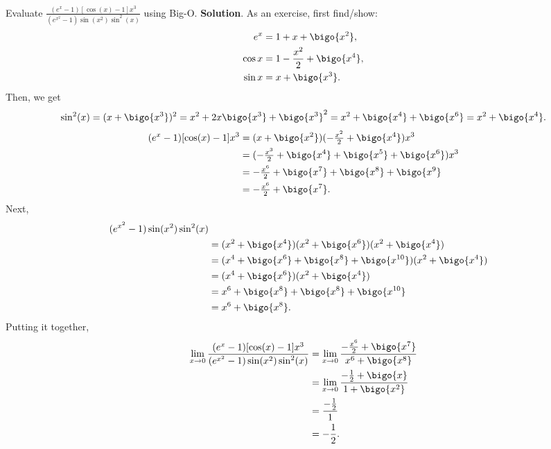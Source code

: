 \begin{Example}{}{}
    Evaluate $ \displaystyle \frac{(e^x-1)[\cos(x)-1]x^3}{(e^{x^2}-1)\sin(x^2)\sin^2(x)} $
    using Big-O\@.
    \tcblower{}
    \textbf{Solution}. As an exercise, first find/show:
    \begin{align*}
        e^x    & =1+x+\bigo{x^2},             \\
        \cos x & =1-\frac{x^2}{2}+\bigo{x^4}, \\
        \sin x & =x+\bigo{x^3}.
    \end{align*}
    Then, we get
    \[ \sin^2(x)=(x+\bigo{x^3})^2=x^2+2x\bigo{x^3}+\bigo{x^3}^2
        =x^2+\bigo{x^4}+\bigo{x^6}=x^2+\bigo{x^4}. \]
    \begin{align*}
        (e^x-1)[\cos(x)-1]x^3
         & =(x+\bigo{x^2})(-\tfrac{x^2}{2}+\bigo{x^4})x^3         \\
         & =(-\tfrac{x^3}{2}+\bigo{x^4}+\bigo{x^5}+\bigo{x^6})x^3 \\
         & =-\tfrac{x^6}{2}+\bigo{x^7}+\bigo{x^8}+\bigo{x^9}      \\
         & =-\tfrac{x^6}{2}+\bigo{x^7}.
    \end{align*}
    Next,
    \begin{align*}
        (e^{x^2}-1)\sin(x^2)\sin^2(x)                                 \\
         & =(x^2+\bigo{x^4})(x^2+\bigo{x^6})(x^2+\bigo{x^4})          \\
         & =(x^4+\bigo{x^6}+\bigo{x^8}+\bigo{x^{10}})(x^2+\bigo{x^4}) \\
         & =(x^4+\bigo{x^6})(x^2+\bigo{x^4})                          \\
         & =x^6+\bigo{x^8}+\bigo{x^8}+\bigo{x^{10}}                   \\
         & =x^6+\bigo{x^8}.
    \end{align*}
    Putting it together,
    \begin{align*}
        \lim\limits_{{x} \to {0}}
        \frac{(e^x-1)[\cos(x)-1]x^3}{(e^{x^2}-1)\sin(x^2)\sin^2(x)}
         & =\lim\limits_{{x} \to {0}}\frac{-\tfrac{x^6}{2}+\bigo{x^7}}{x^6+\bigo{x^8}} \\
         & =\lim\limits_{{x} \to {0}}\frac{-\tfrac{1}{2}+\bigo{x}}{1+\bigo{x^2}}       \\
         & =\frac{-\tfrac{1}{2}}{1}                                                    \\
         & =-\frac{1}{2}.
    \end{align*}
\end{Example}
